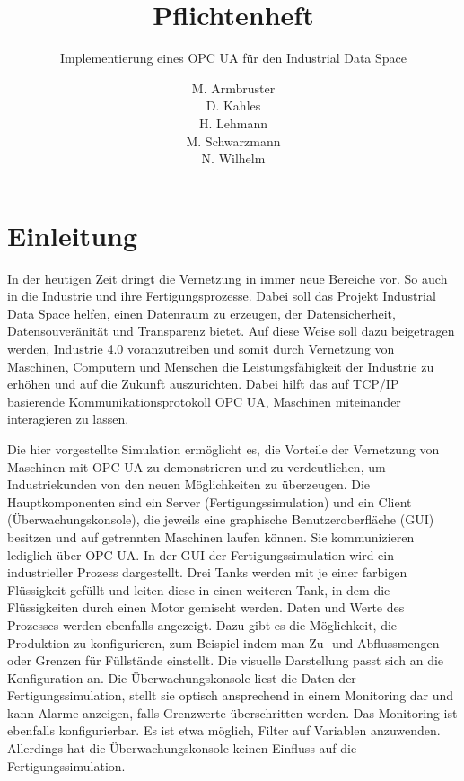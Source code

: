 \documentclass[parskip=full]{scrartcl}
\title{Pflichtenheft}
\subtitle{Implementierung eines OPC UA \glslink{Systemadapter}{Systemadapters} für den \gls{Industrial Data Space}}
\author{
    M. Armbruster\\
    D. Kahles\\
    H. Lehmann\\
    M. Schwarzmann\\
    N. Wilhelm
}
\begin{document}
\maketitle
\tableofcontents
\pagebreak

\section{Einleitung}
In der heutigen Zeit dringt die Vernetzung in immer neue Bereiche vor. So auch in die Industrie und ihre Fertigungsprozesse.
Dabei soll das Projekt Industrial Data Space helfen, einen Datenraum zu erzeugen, der Datensicherheit, Datensouveränität und
Transparenz bietet. Auf diese Weise soll dazu beigetragen werden, Industrie 4.0 voranzutreiben und somit durch Vernetzung von
Maschinen, Computern und Menschen die Leistungsfähigkeit der Industrie zu erhöhen und auf die Zukunft auszurichten.
Dabei hilft das auf TCP/IP basierende Kommunikationsprotokoll OPC UA, Maschinen miteinander interagieren zu lassen.

Die hier vorgestellte Simulation ermöglicht es, die Vorteile der Vernetzung von Maschinen mit OPC UA zu demonstrieren und zu verdeutlichen, um Industriekunden von den neuen Möglichkeiten zu überzeugen.
Die Hauptkomponenten sind ein Server (Fertigungssimulation) und ein Client (Überwachungskonsole),
die jeweils eine graphische Benutzeroberfläche (GUI) besitzen und auf getrennten Maschinen laufen können.
Sie kommunizieren lediglich über OPC UA.
In der GUI der Fertigungssimulation wird ein industrieller Prozess dargestellt.
Drei Tanks werden mit je einer farbigen Flüssigkeit gefüllt und leiten diese in einen weiteren Tank,
in dem die Flüssigkeiten durch einen Motor gemischt werden. Daten und Werte des Prozesses werden ebenfalls angezeigt. Dazu gibt es
die Möglichkeit, die Produktion zu konfigurieren,  zum Beispiel indem man Zu- und Abflussmengen oder Grenzen für Füllstände einstellt. Die visuelle Darstellung passt sich an die Konfiguration an.
Die Überwachungskonsole liest die Daten der Fertigungssimulation, stellt sie optisch ansprechend in einem Monitoring dar
und kann Alarme anzeigen, falls Grenzwerte überschritten werden. Das Monitoring ist ebenfalls konfigurierbar. Es ist etwa möglich, Filter auf Variablen anzuwenden. Allerdings hat die Überwachungskonsole keinen Einfluss auf die Fertigungssimulation.
\end{document}
